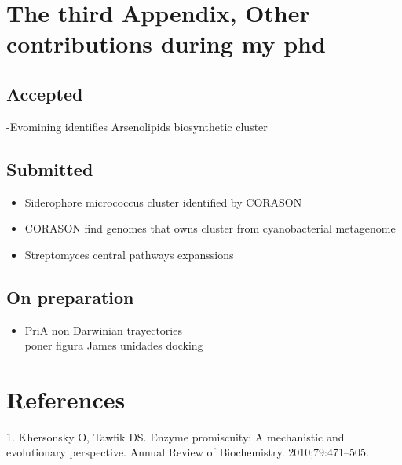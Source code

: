 \documentclass[12pt,twoside]{reedthesis}
\providecommand{\tightlist}{%
  \setlength{\itemsep}{0pt}\setlength{\parskip}{0pt}}
\begin{document}
  \chapter{The third Appendix, Other contributions during my
  phd}\label{the-third-appendix-other-contributions-during-my-phd}
  
  \section{Accepted}\label{accepted}
  
  -Evomining identifies Arsenolipids biosynthetic cluster
  
  \section{Submitted}\label{submitted}
  
  \begin{itemize}
  \tightlist
  \item
    Siderophore micrococcus cluster identified by CORASON\\
  \item
    CORASON find genomes that owns cluster from cyanobacterial
    metagenome\\
  \item
    Streptomyces central pathways expanssions
  \end{itemize}
  
  \section{On preparation}\label{on-preparation}
  
  \begin{itemize}
  \tightlist
  \item
    PriA non Darwinian trayectories\\
    poner figura James unidades docking
  \end{itemize}
  
  \backmatter
  
  \chapter{References}\label{references}
  
  \noindent
  
  \setlength{\parindent}{-0.20in} \setlength{\leftskip}{0.20in}
  \setlength{\parskip}{8pt}
  
  \hypertarget{refs}{}
  \hypertarget{ref-khersonsky_enzyme_2010}{}
  1. Khersonsky O, Tawfik DS. Enzyme promiscuity: A mechanistic and
  evolutionary perspective. Annual Review of Biochemistry.
  2010;79:471--505.
  
\end{document}
